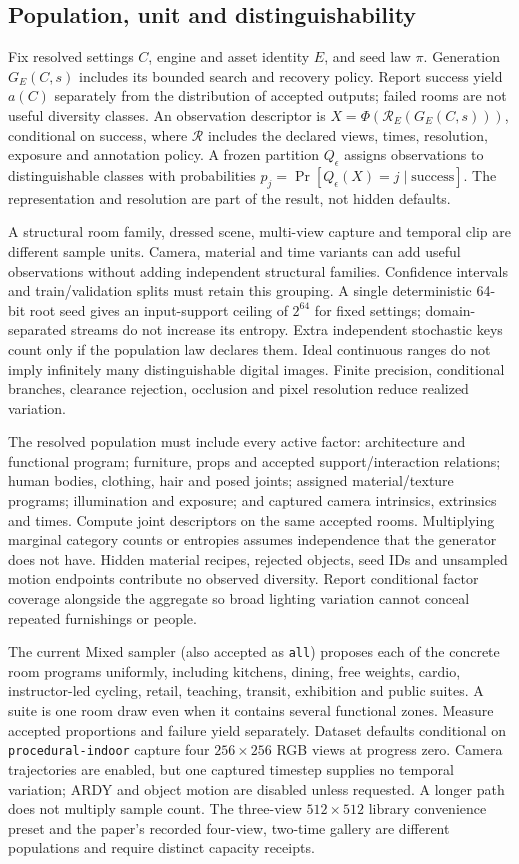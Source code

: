 \documentclass{article}
\begin{document}
\subsection{Population, unit and distinguishability}
Fix resolved settings $C$, engine and asset identity $E$, and seed law $\pi$.
Generation $G_E(C,s)$ includes its bounded search and recovery policy. Report
success yield $a(C)$ separately from the distribution of accepted outputs;
failed rooms are not useful diversity classes. An observation descriptor is
$X=\Phi(\mathcal R_E(G_E(C,s)))$, conditional on success, where $\mathcal R$
includes the declared views, times, resolution, exposure and annotation policy.
A frozen partition $Q_\epsilon$ assigns observations to distinguishable classes
with probabilities $p_j=\Pr[Q_\epsilon(X)=j\mid\mathrm{success}]$.
The representation and resolution are part of the result, not hidden defaults.

A structural room family, dressed scene, multi-view capture and temporal clip
are different sample units. Camera, material and time variants can add useful
observations without adding independent structural families. Confidence intervals
and train/validation splits must retain this grouping. A single deterministic
64-bit root seed gives an input-support ceiling of $2^{64}$ for fixed settings;
domain-separated streams do not increase its entropy. Extra independent stochastic
keys count only if the population law declares them. Ideal continuous ranges do
not imply infinitely many distinguishable digital images. Finite precision,
conditional branches, clearance rejection, occlusion and pixel resolution reduce
realized variation.

The resolved population must include every active factor: architecture and
functional program; furniture, props and accepted support/interaction relations;
human bodies, clothing, hair and posed joints; assigned material/texture programs;
illumination and exposure; and captured camera intrinsics, extrinsics and times.
Compute joint descriptors on the same accepted rooms. Multiplying marginal
category counts or entropies assumes independence that the generator does not
have. Hidden material recipes, rejected objects, seed IDs and unsampled motion
endpoints contribute no observed diversity. Report conditional factor coverage
alongside the aggregate so broad lighting variation cannot conceal repeated
furnishings or people.

The current Mixed sampler (also accepted as \texttt{all}) proposes each of the
concrete room programs uniformly, including kitchens, dining, free weights, cardio, instructor-led cycling,
retail, teaching, transit, exhibition and public suites. A suite is one room draw even
when it contains several functional zones. Measure accepted proportions and
failure yield separately. Dataset defaults conditional on
\texttt{procedural-indoor} capture four $256\times256$ RGB views at progress zero.
Camera trajectories are enabled, but one captured timestep supplies no temporal
variation; ARDY and object motion are disabled unless requested. A longer path
does not multiply sample count. The three-view $512\times512$ library convenience
preset and the paper's recorded four-view, two-time gallery are different
populations and require distinct capacity receipts.
\end{document}
